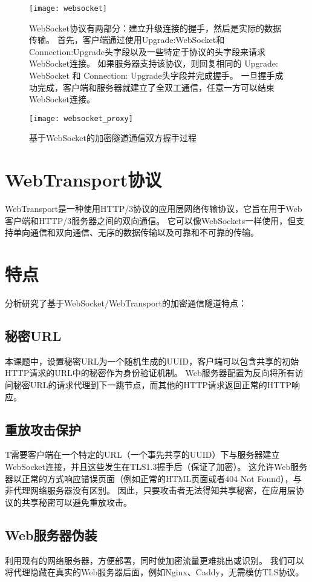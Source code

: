 \begin{figure}[H]
  \centering
  \texttt{[image: websocket]}
  \caption{WebSocket协议有两部分：建立升级连接的握手，然后是实际的数据传输。
  首先，客户端通过使用Upgrade:WebSocket和Connection:Upgrade头字段以及一些特定于协议的头字段来请求WebSocket连接。 
  如果服务器支持该协议，则回复相同的 Upgrade: WebSocket 和 Connection: Upgrade头字段并完成握手。
  一旦握手成功完成，客户端和服务器就建立了全双工通信，任意一方可以结束WebSocket连接。}
\end{figure}

\begin{figure}[H]
  \centering
  \texttt{[image: websocket\_proxy]}
  \caption{基于WebSocket的加密隧道通信双方握手过程}
\end{figure}

\section{WebTransport协议}
WebTransport是一种使用HTTP/3协议的应用层网络传输协议，它旨在用于Web客户端和HTTP/3服务器之间的双向通信。 
它可以像WebSockets一样使用，但支持单向通信和双向通信、无序的数据传输以及可靠和不可靠的传输。

\section{特点}
分析研究了基于WebSocket/WebTransport的加密通信隧道特点：

\subsection{秘密URL}
本课题中，设置秘密URL为一个随机生成的UUID，客户端可以包含共享的初始HTTP请求的URL中的秘密作为身份验证机制。 
Web服务器配置为反向将所有访问秘密URL的请求代理到下一跳节点，而其他的HTTP请求返回正常的HTTP响应。

\subsection{重放攻击保护}
T需要客户端在一个特定的URL（一个事先共享的UUID）下与服务器建立WebSocket连接，并且这些发生在TLS1.3握手后（保证了加密）。
这允许Web服务器以正常的方式响应错误页面（例如正常的HTML页面或者404 Not Found），与非代理网络服务器没有区别。 
因此，只要攻击者无法得知共享秘密，在应用层协议的共享秘密可以避免重放攻击。

\subsection{Web服务器伪装}
利用现有的网络服务器，方便部署，同时使加密流量更难挑出或识别。
我们可以将代理隐藏在真实的Web服务器后面，例如Nginx、Caddy，无需模仿TLS协议。

